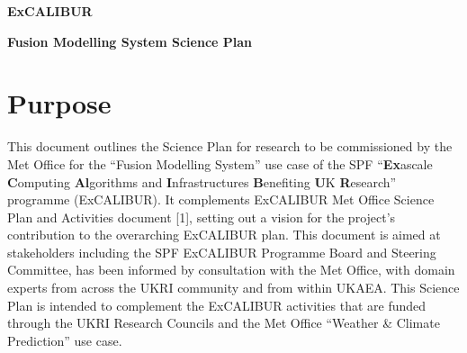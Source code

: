 \documentclass[a4paper]{article}
\begin{document}
\bigskip


\bigskip


\bigskip


\bigskip


\bigskip


\bigskip


\bigskip


\bigskip


\bigskip


\bigskip


\bigskip


\bigskip


\bigskip


\bigskip


\bigskip


\bigskip


\bigskip

{
\textbf{\textcolor[rgb]{0.12156863,0.28627452,0.49019608}{ExCALIBUR}}}

{
\textbf{\textcolor[rgb]{0.12156863,0.28627452,0.49019608}{Fusion Modelling 
System Science Plan }}}

\section[Purpose]{\textcolor[rgb]{0.12156863,0.28627452,0.49019608}{Purpose}}

\bigskip

{\color{black}
This document outlines the Science Plan for research to be commissioned by the 
Met Office for the ``Fusion Modelling
System'' use case of the SPF 
``\textbf{\textcolor[rgb]{0.12156863,0.28627452,0.49019608}{Ex}}ascale
\textbf{\textcolor[rgb]{0.12156863,0.28627452,0.49019608}{C}}omputing
\textbf{\textcolor[rgb]{0.12156863,0.28627452,0.49019608}{Al}}gorithms and
\textbf{\textcolor[rgb]{0.12156863,0.28627452,0.49019608}{I}}nfrastructures
\textbf{\textcolor[rgb]{0.12156863,0.28627452,0.49019608}{B}}enefiting
\textbf{\textcolor[rgb]{0.12156863,0.28627452,0.49019608}{U}}K
\textbf{\textcolor[rgb]{0.12156863,0.28627452,0.49019608}{R}}esearch'' 
programme (ExCALIBUR). It complements ExCALIBUR
Met Office Science Plan and Activities document [1], setting out a vision for 
the project's contribution to the
overarching ExCALIBUR plan. This document is aimed at stakeholders including 
the SPF ExCALIBUR Programme Board and
Steering Committee, has been informed by consultation with the Met Office, with 
domain experts from across the UKRI
community and from within UKAEA. This Science Plan is intended to complement 
the ExCALIBUR activities that are funded
through the UKRI Research Councils and the Met Office ``Weather \& Climate 
Prediction'' use case.}
\end{document}
